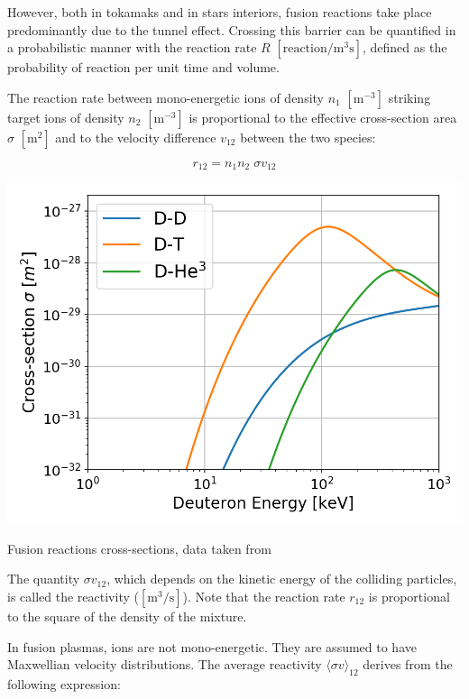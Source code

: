 However, both in tokamaks and in stars interiors, fusion reactions take place predominantly due to the tunnel effect. Crossing this barrier can be quantified in a probabilistic manner with the reaction rate $R$ $[\mathrm{reaction/m^3 s}]$, defined as the probability of reaction per unit time and volume. 

The reaction rate between mono-energetic ions of density $n_1$ $\mathrm{[m^{-3}]}$ striking target ions of density $n_2$ $\mathrm{[m^{-3}]}$ is proportional to the effective cross-section area $\sigma$ $\mathrm{[m^2]}$ and to the velocity difference $v_{12}$ between the two species:

\begin{equation*}
r_{12} = n_1 n_2 \; \sigma v_{12}
\end{equation*}

\begin{marginfigure}
	\includegraphics[width=1\textwidth]{figures/Fusion_cross-section.png}
	\caption{Fusion reactions cross-sections, data taken from \cite{Huba2013} }
	\label{fig:crosssection_adv}
\end{marginfigure}

The quantity $\sigma v_{12}$, which depends on the kinetic energy of the colliding particles, is called the reactivity ($\mathrm{[m^3/s]}$). Note that the reaction rate $r_{12}$ is proportional to the square of the density of the mixture. 

In fusion plasmas, ions are not mono-energetic. They are assumed to have Maxwellian velocity distributions. The average reactivity $\langle \sigma v \rangle_{12}$ derives from the following expression:

